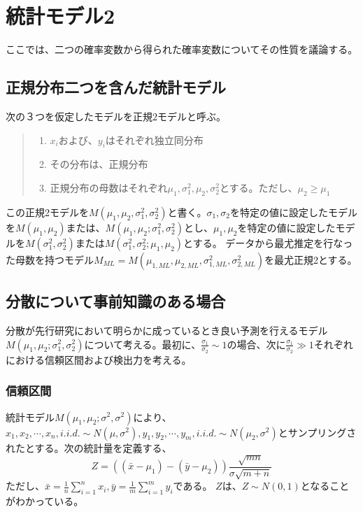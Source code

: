 

\chapter{統計モデル2}
ここでは、二つの確率変数から得られた確率変数についてその性質を議論する。

\section{正規分布二つを含んだ統計モデル}
次の３つを仮定したモデルを正規$2$モデルと呼ぶ。
\begin{quote}
    \begin{enumerate}[(1)]
    \item $x_i$および、$y_i$はそれぞれ独立同分布
    \item その分布は、正規分布
    \item 正規分布の母数はそれぞれ$\mu_1,\sigma_1^2,\mu_2,\sigma_2^2$とする。ただし、$\mu_2\geq \mu_1$
    \end{enumerate}
\end{quote}
この正規2モデルを$M(\mu_1,\mu_2,\sigma_1^2,\sigma_2^2)$と書く。$\sigma_1,\sigma_2$を特定の値に設定したモデルを$M(\mu_1,\mu_2)$または、$M(\mu_1,\mu_2;\sigma^2_1,\sigma^2_2)$とし、$\mu_1,\mu_2$を特定の値に設定したモデルを$M(\sigma_1^2,\sigma_2^2)$または$M(\sigma_1^2,\sigma_2^2;\mu_1,\mu_2)$とする。
データから最尤推定を行なった母数を持つモデル$M_{ML}=M(\mu_{1,ML},\mu_{2,ML},\sigma_{1,ML}^2,\sigma^2_{2,ML})$を最尤正規2とする。

\section{分散について事前知識のある場合}
分散が先行研究において明らかに成っているとき良い予測を行えるモデル$M(\mu_1,\mu_2;\sigma^2_1,\sigma^2_2)$について考える。最初に、$\frac{\sigma_1}{\sigma_2}\sim 1$の場合、次に$\frac{\sigma_1}{\sigma_2} \gg 1$それぞれにおける信頼区間および検出力を考える。

\subsection{信頼区間}
統計モデル$M(\mu_1,\mu_2;\sigma^2,\sigma^2)$により、$x_1,x_2,\cdots,x_n, i.i.d. \sim N(\mu,\sigma^2),y_1,y_2,\cdots,y_m, i.i.d.\sim N(\mu_2,\sigma^2)$とサンプリングされたとする。次の統計量を定義する、
\begin{equation*}
 Z=((\bar{x}-\mu_1)-(\bar{y}-\mu_2))\frac{\sqrt{mn}}{\sigma\sqrt{m+n}} 
\end{equation*}
ただし、$\bar{x}=\frac{1}{n}\sum_{i=1}^{n} x_i,\bar{y}=\frac{1}{m}\sum_{i=1}^m y_i$である。
$Z$は、$Z\sim N(0,1)$となることがわかっている。

